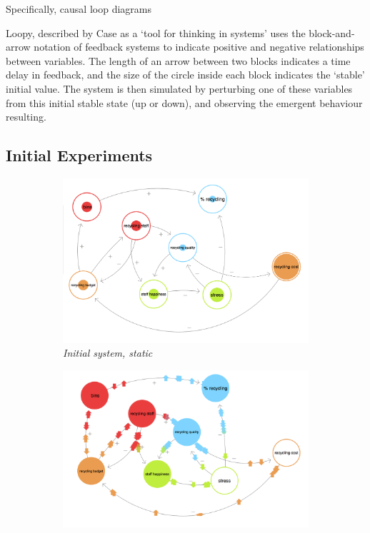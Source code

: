 \documentclass[nofonts,nols,justified,nobib]{tufte-book}
\begin{document}
Specifically, causal loop diagrams %

Loopy, described by Case as a `tool for thinking in systems' uses the block-and-arrow notation of feedback systems to indicate positive and negative relationships between variables. The length of an arrow between two blocks indicates a time delay in feedback, and the size of the circle inside each block indicates the `stable' initial value. The system is then simulated by perturbing one of these variables from this initial stable state (up or down), and observing the emergent behaviour resulting.

\subsection*{Initial Experiments}

\begin{figure}
  \centering
  \caption{Initial Experiments with \emph{Loopy!}}
  \label{optimising}
\begin{subfigure}{.3\textwidth}
  \centering
  \includegraphics[width=1\linewidth]{img/3/loopy/small-static.png}
\caption{\textit{Initial system, static}}
\end{subfigure}
 \quad
\begin{subfigure}{.3\textwidth}
  \centering
  \includegraphics[width=1\linewidth]{img/3/loopy/small-win.png}

\end{subfigure}
\end{figure}
\end{document}

